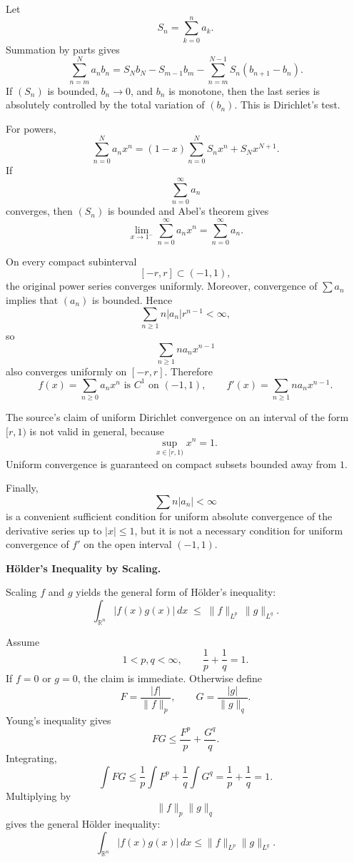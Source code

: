 \begin{solution}
Let
\[
S_n=\sum_{k=0}^{n}a_k.
\]
Summation by parts gives
\[
\sum_{n=m}^{N}a_nb_n
=
S_Nb_N
-
S_{m-1}b_m
-
\sum_{n=m}^{N-1}
S_n(b_{n+1}-b_n).
\]
If \((S_n)\) is bounded, \(b_n\to0\), and \(b_n\) is monotone, then the last series is
absolutely controlled by the total variation of \((b_n)\). This is Dirichlet's test.

For powers,
\[
\sum_{n=0}^{N}a_nx^n
=
(1-x)\sum_{n=0}^{N}S_nx^n
+
S_Nx^{N+1}.
\]
If
\[
\sum_{n=0}^{\infty}a_n
\]
converges, then \((S_n)\) is bounded and Abel's theorem gives
\[
\boxed{
\lim_{x\to1^-}
\sum_{n=0}^{\infty}a_nx^n
=
\sum_{n=0}^{\infty}a_n.
}
\]

On every compact subinterval
\[
[-r,r]\subset(-1,1),
\]
the original power series converges uniformly. Moreover, convergence of
\(\sum a_n\) implies that \((a_n)\) is bounded. Hence
\[
\sum_{n\ge1}
n|a_n|r^{n-1}
<\infty,
\]
so
\[
\sum_{n\ge1}
na_nx^{n-1}
\]
also converges uniformly on \([-r,r]\). Therefore
\[
\boxed{
f(x)=\sum_{n\ge0}a_nx^n
\text{ is }C^1\text{ on }(-1,1),
\qquad
f'(x)=\sum_{n\ge1}na_nx^{n-1}.
}
\]

The source's claim of uniform Dirichlet convergence on an interval of the form
\([r,1)\) is not valid in general, because
\[
\sup_{x\in[r,1)}x^n=1.
\]
Uniform convergence is guaranteed on compact subsets bounded away from \(1\).

Finally,
\[
\sum n|a_n|<\infty
\]
is a convenient sufficient condition for uniform absolute convergence of the derivative
series up to \(|x|\le1\), but it is not a necessary condition for uniform convergence of
\(f'\) on the open interval \((-1,1)\).
\end{solution}


\begin{problem}[CP-II-0557]
\label{prob:cp-ii-0557}
\textbf{Hölder's Inequality by Scaling.}

\hspace*{1.5em}Scaling $f$ and $g$ yields the general form of Hölder's inequality:
	\[
	\int_{\mathbb{R}^n} |f(x)g(x)|\,dx
	\;\le\;
	\|f\|_{L^p}\,\|g\|_{L^q}.
	\]
\end{problem}

\begin{solution}
Assume
\[
1<p,q<\infty,
\qquad
\frac1p+\frac1q=1.
\]
If \(f=0\) or \(g=0\), the claim is immediate. Otherwise define
\[
F=\frac{|f|}{\|f\|_p},
\qquad
G=\frac{|g|}{\|g\|_q}.
\]
Young's inequality gives
\[
FG
\le
\frac{F^p}{p}
+
\frac{G^q}{q}.
\]
Integrating,
\[
\int FG
\le
\frac1p\int F^p
+
\frac1q\int G^q
=
\frac1p+\frac1q
=
1.
\]
Multiplying by
\[
\|f\|_p\|g\|_q
\]
gives the general Hölder inequality:
\[
\boxed{
\int_{\mathbb R^n}|f(x)g(x)|\,dx
\le
\|f\|_{L^p}
\|g\|_{L^q}.
}
\]
\end{solution}


